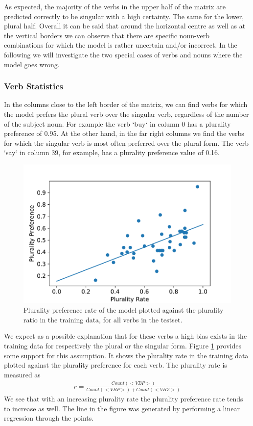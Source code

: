 As expected, the majority of the verbs in the upper half of the matrix are predicted correctly to be singular with a high certainty. The same for the lower, plural half. Overall it can be said that around the horizontal centre 
as well as at the vertical borders we can observe that there are specific 
noun-verb combinations for which the model is rather uncertain and/or incorrect. 
In the following we will investigate the two special cases of verbs and nouns where the model goes wrong.

\subsubsection{Verb Statistics}

In the columns close to the left border of the matrix, we can find verbs for which the model prefers the plural verb over the singular verb, regardless of the number of the subject noun. For example the verb `buy` in column 0 has a plurality preference of 0.95. At the other hand, in the far right columns we find the verbs for which the singular verb is most often preferred over the plural form. The verb `say` in column 39, for example, has a plurality preference value of 0.16.

     \begin{figure}
     \centering
        \includegraphics[scale=0.5]{lin_reg.pdf}
        \caption{Plurality preference rate of the model 
        plotted against the plurality ratio in the training 
        data, for all verbs in the testset.}
        \label{fig:lin_reg}
    \end{figure}

We expect as a possible explanation that for these verbs a high bias exists
in the training data for respectively the plural or the singular form.
Figure \ref{fig:lin_reg} provides some support for this assumption. It shows the plurality rate in the training data plotted against the plurality preference for each verb. 
The plurality rate is measured as
\begin{align*}
	r = \frac{Count(<VBP>)}{Count(<VBP>) + Count(<VBZ>)} 
\end{align*}
We see that with an increasing plurality rate the plurality preference rate tends to increase as well. The line in the figure was generated by performing a linear regression through the points. 

